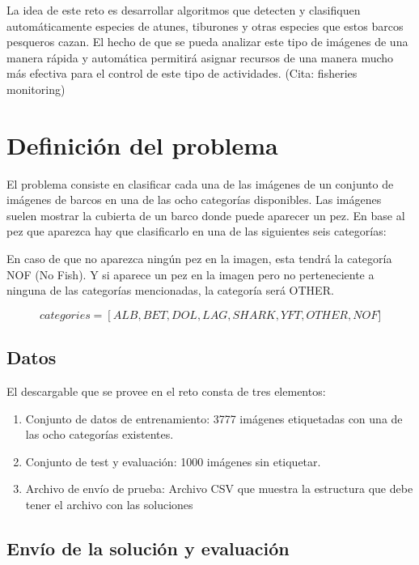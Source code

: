 La idea de este reto es desarrollar algoritmos que detecten y clasifiquen automáticamente especies de atunes, tiburones y otras especies que estos barcos pesqueros cazan. El hecho de que se pueda analizar este tipo de imágenes de una manera rápida y automática permitirá asignar recursos de una manera mucho más efectiva para el control de este tipo de actividades. (Cita: fisheries monitoring)

\section{Definición del problema}

El problema consiste en clasificar cada una de las imágenes de un conjunto de imágenes de barcos en una de las ocho categorías disponibles. Las imágenes suelen mostrar la cubierta de un barco donde puede aparecer un pez. En base al pez que aparezca hay que clasificarlo en una de las siguientes seis categorías:

\begin{center}
\end{center}

En caso de que no aparezca ningún pez en la imagen, esta tendrá la categoría NOF (No Fish). Y si aparece un pez en la imagen pero no perteneciente a ninguna de las categorías mencionadas, la categoría será OTHER.

\[
  categories =
  \left[ALB, BET, DOL, LAG, SHARK, YFT, OTHER, NOF]
\]

\subsection{Datos}

El descargable que se provee en el reto consta de tres elementos:

\begin{enumerate}
  \item{Conjunto de datos de entrenamiento: 3777 imágenes etiquetadas con una de las ocho categorías existentes.}
  \item{Conjunto de test y evaluación: 1000 imágenes sin etiquetar.}
  \item{Archivo de envío de prueba: Archivo CSV que muestra la estructura que debe tener el archivo con las soluciones}
\end{enumerate}

\subsection{Envío de la solución y evaluación}
\label{sec:envio-y-eval}

